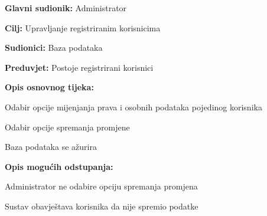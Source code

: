 					\noindent{}
					\begin{packed_item}
						
						\item \textbf{Glavni sudionik: }Administrator
						\item  \textbf{Cilj:} Upravljanje registriranim korisnicima
						\item  \textbf{Sudionici:} Baza podataka
						\item  \textbf{Preduvjet:} Postoje registrirani korisnici
						\item  \textbf{Opis osnovnog tijeka:}
						
						\item[] \begin{packed_enum}
							
							\item Odabir opcije mijenjanja prava i osobnih podataka pojedinog korisnika
							\item Odabir opcije spremanja promjene
							\item Baza podataka se ažurira
							
						\end{packed_enum}
						
						\item  \textbf{Opis mogućih odstupanja:}
						
						\item[] \begin{packed_item}
							
							\item[2.a] Administrator ne odabire opciju spremanja promjena
							\item[] \begin{packed_enum}
								
								\item Sustav obavještava korisnika da nije spremio podatke 
								
							\end{packed_enum}
							
						\end{packed_item}
						
					\end{packed_item}
					
